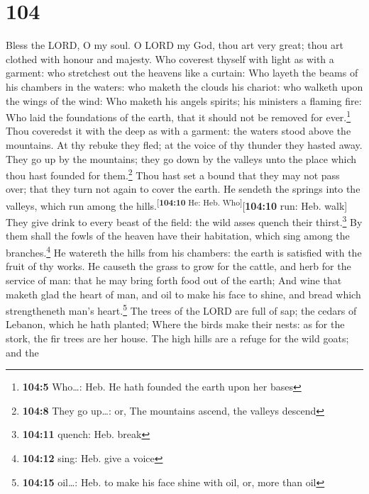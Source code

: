 \hypertarget{section-103}{%
\section{104}\label{section-103}}

 Bless the LORD, O my soul. O LORD my God, thou art very
great; thou art clothed with honour and majesty.  Who
coverest thyself with light as with a garment: who stretchest out the
heavens like a curtain:  Who layeth the beams of his
chambers in the waters: who maketh the clouds his chariot: who walketh
upon the wings of the wind:  Who maketh his angels
spirits; his ministers a flaming fire:  Who laid the
foundations of the earth, that it should not be removed for
ever.\footnote{\textbf{104:5} Who\ldots: Heb. He hath founded the earth
  upon her bases}  Thou coveredst it with the deep as with
a garment: the waters stood above the mountains.  At thy
rebuke they fled; at the voice of thy thunder they hasted away.
 They go up by the mountains; they go down by the valleys
unto the place which thou hast founded for them.\footnote{\textbf{104:8}
  They go up\ldots: or, The mountains ascend, the valleys descend}
 Thou hast set a bound that they may not pass over; that
they turn not again to cover the earth.  He sendeth the
springs into the valleys, which run among the
hills.\textsuperscript{{[}\textbf{104:10} He: Heb.
Who{]}}{[}\textbf{104:10} run: Heb. walk{]}  They give
drink to every beast of the field: the wild asses quench their
thirst.\footnote{\textbf{104:11} quench: Heb. break}  By
them shall the fowls of the heaven have their habitation, which sing
among the branches.\footnote{\textbf{104:12} sing: Heb. give a voice}
 He watereth the hills from his chambers: the earth is
satisfied with the fruit of thy works.  He causeth the
grass to grow for the cattle, and herb for the service of man: that he
may bring forth food out of the earth;  And wine that
maketh glad the heart of man, and oil to make his face to shine, and
bread which strengtheneth man's heart.\footnote{\textbf{104:15}
  oil\ldots: Heb. to make his face shine with oil, or, more than oil}
 The trees of the LORD are full of sap; the cedars of
Lebanon, which he hath planted;  Where the birds make
their nests: as for the stork, the fir trees are her house.
 The high hills are a refuge for the wild goats; and the
